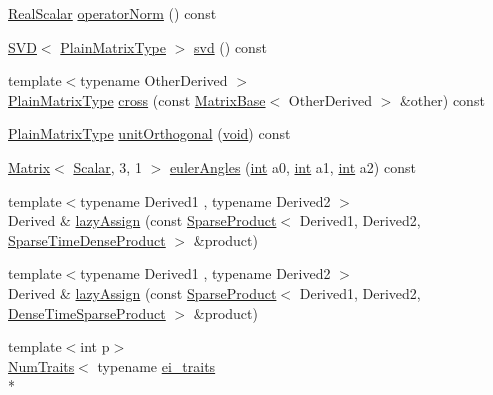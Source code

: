 \begin{DoxyCompactItemize}
\item 
\hyperlink{class_matrix_base_a634804c67de40fec74e3640bc229364c}{Real\-Scalar} \hyperlink{class_matrix_base_af10ace143c1b56f51b1f70c97d4ea8d1}{operator\-Norm} () const 
\item 
\hyperlink{class_s_v_d}{S\-V\-D}$<$ \hyperlink{class_matrix_base_aa6a23b3d1aac2a1b4b9d8bcb54e1e2bc}{Plain\-Matrix\-Type} $>$ \hyperlink{class_matrix_base_a7cc58a003232d5f46712c92c09749dcd}{svd} () const 
\item 
{\footnotesize template$<$typename Other\-Derived $>$ }\\\hyperlink{class_matrix_base_aa6a23b3d1aac2a1b4b9d8bcb54e1e2bc}{Plain\-Matrix\-Type} \hyperlink{class_matrix_base_a9f60241d9ea4cf39386071aafd518210}{cross} (const \hyperlink{class_matrix_base}{Matrix\-Base}$<$ Other\-Derived $>$ \&other) const 
\item 
\hyperlink{class_matrix_base_aa6a23b3d1aac2a1b4b9d8bcb54e1e2bc}{Plain\-Matrix\-Type} \hyperlink{class_matrix_base_a105d176348bd86b2e0d51b428eddcb4c}{unit\-Orthogonal} (\hyperlink{group___u_a_v_objects_plugin_ga444cf2ff3f0ecbe028adce838d373f5c}{void}) const 
\item 
\hyperlink{class_matrix}{Matrix}$<$ \hyperlink{class_matrix_base_a625df8339dc2d816cbc0fd66e7dadaf5}{Scalar}, 3, 1 $>$ \hyperlink{group___geometry___module_gab4c96680314b250adc57bf81a2106f5d}{euler\-Angles} (\hyperlink{ioapi_8h_a787fa3cf048117ba7123753c1e74fcd6}{int} a0, \hyperlink{ioapi_8h_a787fa3cf048117ba7123753c1e74fcd6}{int} a1, \hyperlink{ioapi_8h_a787fa3cf048117ba7123753c1e74fcd6}{int} a2) const 
\item 
{\footnotesize template$<$typename Derived1 , typename Derived2 $>$ }\\Derived \& \hyperlink{class_matrix_base_ae5ade964bfe52f4dadb3f17620f959d2}{lazy\-Assign} (const \hyperlink{class_sparse_product}{Sparse\-Product}$<$ Derived1, Derived2, \hyperlink{_constants_8h_a19539c4a85742928cd91d83569d63c06ac0beebcaabbb5b076c5709ce0848b122}{Sparse\-Time\-Dense\-Product} $>$ \&product)
\item 
{\footnotesize template$<$typename Derived1 , typename Derived2 $>$ }\\Derived \& \hyperlink{class_matrix_base_a4cf4d60607560f433750a5ddafbfbf0c}{lazy\-Assign} (const \hyperlink{class_sparse_product}{Sparse\-Product}$<$ Derived1, Derived2, \hyperlink{_constants_8h_a19539c4a85742928cd91d83569d63c06afde1e002b9d507b2fcaa6e02d9e08141}{Dense\-Time\-Sparse\-Product} $>$ \&product)
\item 
{\footnotesize template$<$int p$>$ }\\\hyperlink{struct_num_traits}{Num\-Traits}$<$ typename \hyperlink{structei__traits}{ei\-\_\-traits}\\*

\end{DoxyCompactItemize}
